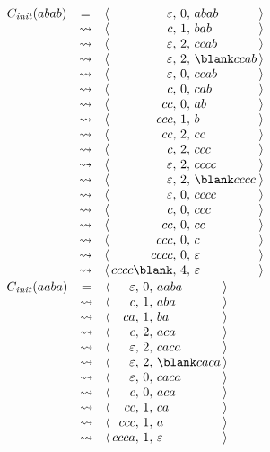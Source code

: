 \begin{exercice}
\begin{corrections}
    $\begin{array}{rc@{\quad \langle\,}r@{,~}c@{,~}l@{\,\rangle}}
      C_{\mathit{init}}(abab)
      & =        & \varepsilon & 0 & abab        \\
      & \leadsto & c           & 1 & bab         \\
      & \leadsto & \varepsilon & 2 & ccab        \\
      & \leadsto & \varepsilon & 2 & \blank ccab \\
      & \leadsto & \varepsilon & 0 & ccab        \\
      & \leadsto & c           & 0 & cab         \\
      & \leadsto & cc          & 0 & ab          \\
      & \leadsto & ccc         & 1 & b           \\
      & \leadsto & cc          & 2 & cc          \\
      & \leadsto & c           & 2 & ccc         \\
      & \leadsto & \varepsilon & 2 & cccc        \\
      & \leadsto & \varepsilon & 2 & \blank cccc \\
      & \leadsto & \varepsilon & 0 & cccc        \\
      & \leadsto & c           & 0 & ccc         \\
      & \leadsto & cc          & 0 & cc          \\
      & \leadsto & ccc         & 0 & c           \\
      & \leadsto & cccc        & 0 & \varepsilon \\
      & \leadsto & cccc\blank  & 4 & \varepsilon \\
    \end{array}$
    $\begin{array}{rc@{\quad \langle\,}r@{,~}c@{,~}l@{\,\rangle}}
      C_{\mathit{init}}(aaba)
      & =        & \varepsilon & 0 & aaba        \\
      & \leadsto & c           & 1 & aba         \\
      & \leadsto & ca          & 1 & ba          \\
      & \leadsto & c           & 2 & aca         \\
      & \leadsto & \varepsilon & 2 & caca        \\
      & \leadsto & \varepsilon & 2 & \blank caca \\
      & \leadsto & \varepsilon & 0 & caca        \\
      & \leadsto & c           & 0 & aca         \\
      & \leadsto & cc          & 1 & ca          \\
      & \leadsto & ccc         & 1 & a           \\
      & \leadsto & ccca        & 1 & \varepsilon \\
    \end{array}$
  \end{corrections}
  

\end{exercice}
